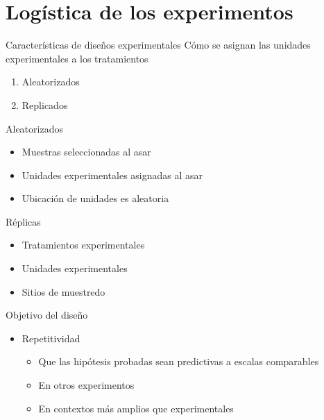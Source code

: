 \documentclass[
  11pt,
  ignorenonframetext,
]{beamer}
\begin{document}
\hypertarget{loguxedstica-de-los-experimentos}{%
\section{Logística de los
experimentos}\label{loguxedstica-de-los-experimentos}}

\begin{frame}{Características de diseños experimentales}
\protect\hypertarget{caracteruxedsticas-de-diseuxf1os-experimentales}{}
Cómo se asignan las unidades experimentales a los tratamientos

\begin{enumerate}
\item
  Aleatorizados
\item
  Replicados
\end{enumerate}
\end{frame}

\begin{frame}{Aleatorizados}
\protect\hypertarget{aleatorizados}{}
\begin{itemize}
\item
  Muestras seleccionadas al asar
\item
  Unidades experimentales asignadas al asar
\item
  Ubicación de unidades es aleatoria
\end{itemize}
\end{frame}

\begin{frame}{Réplicas}
\protect\hypertarget{ruxe9plicas}{}
\begin{itemize}
\item
  Tratamientos experimentales
\item
  Unidades experimentales
\item
  Sitios de muestredo
\end{itemize}
\end{frame}

\begin{frame}{Objetivo del diseño}
\protect\hypertarget{objetivo-del-diseuxf1o}{}
\begin{itemize}
\item
  Repetitividad

  \begin{itemize}
  \item
    Que las hipótesis probadas sean predictivas a escalas comparables
  \item
    En otros experimentos
  \item
    En contextos más amplios que experimentales
  \end{itemize}
\end{itemize}
\end{frame}
\end{document}
